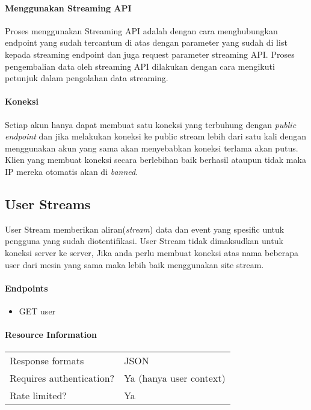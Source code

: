 \paragraph{Menggunakan Streaming API}
Proses menggunakan Streaming API adalah dengan cara menghubungkan endpoint yang sudah tercantum di atas dengan parameter yang sudah di list kepada streaming endpoint dan juga request parameter streaming API. Proses pengembalian data oleh streaming API dilakukan dengan cara mengikuti petunjuk dalam pengolahan data streaming.

\paragraph{Koneksi}
Setiap akun hanya dapat membuat satu koneksi yang terbuhung dengan \textit{public endpoint} dan jika melakukan koneksi ke public stream lebih dari satu kali dengan menggunakan akun yang sama akan menyebabkan koneksi terlama akan putus. Klien yang membuat koneksi secara berlebihan baik berhasil ataupun tidak maka IP mereka otomatis akan di \textit{banned}.

\subsection{User Streams}
User Stream memberikan aliran(\textit{stream}) data dan event yang spesific untuk pengguna yang sudah diotentifikasi. User Stream tidak dimaksudkan untuk koneksi server ke server, Jika anda perlu membuat koneksi atas nama beberapa user dari mesin yang sama maka lebih baik menggunakan site stream.

\paragraph{Endpoints}
\begin{itemize}
	\item GET user
\end{itemize}
\paragraph{Resource Information}
\begin{table}[h]
\begin{tabular}{|l|l|}
Response formats         & JSON                    \\
Requires authentication? & Ya (hanya user context) \\
Rate limited?            & Ya                    
\end{tabular}
\end{table}


